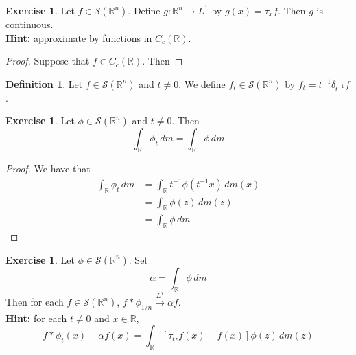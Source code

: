 \documentclass[12pt]{amsart}
\theoremstyle{definition}
\newtheorem{defn}[definition]{Definition}
\newtheorem{ex}[definition]{Exercise}
\newcommand{\al}{\alpha}
\newcommand{\del}{\delta}
\newcommand{\R}{\mathbb{R}}
\newcommand{\MS}{\mathcal{S}}
\newcommand{\dm}{\, d m}
\newcommand{\conv}[1]{\xrightarrow{#1}}
\begin{document}
	\begin{ex}
		Let $f \in \MS(\R^n)$. Define $g: \R^n \rightarrow L^1$ by $g(x) = \tau_x f$. Then $g$ is continuous. \\
		\textbf{Hint:} approximate by functions in $C_c(\R)$.
	\end{ex}

	\begin{proof}
		Suppose that $f \in C_c(\R)$. Then
	\end{proof}

	\begin{defn}
		Let $f \in \MS(\R^n)$ and $t \neq 0$. We define $f_t \in \MS(\R^n)$ by $f_t = t^{-1} \del_{t^{-1}} f$.   
	\end{defn}

	\begin{ex}
		Let $\phi \in \MS(\R^n)$ and $t \neq 0$. Then 
		$$\int_{\R}\phi_t \dm = \int_{\R} \phi \dm$$ 
	\end{ex}

	\begin{proof}
		We have that 
		\begin{align*}
			\int_{\R}\phi_t \dm 
			& = \int_{\R}t^{-1}\phi(t^{-1}x) \dm(x) \\
			& = \int_{\R} \phi(z) \dm(z) \\
			& = \int_{\R}\phi \dm 
		\end{align*}
	\end{proof}

	\begin{ex}
		Let $\phi \in \MS(\R^n)$. Set 
		$$\al = \int_{\R} \phi \dm$$ 
		Then for each $f \in \MS(\R^n)$,  $f * \phi_{1/n} \conv{L^1} \al f$. \\
		\textbf{Hint:} for each $t \neq 0$ and $x \in \R$, 
		$$f * \phi_t(x) - \al f(x) = \int_{\R} [\tau_{tz}f(x)  -  f(x)] \phi(z) \dm(z) $$
	\end{ex}
\end{document}
